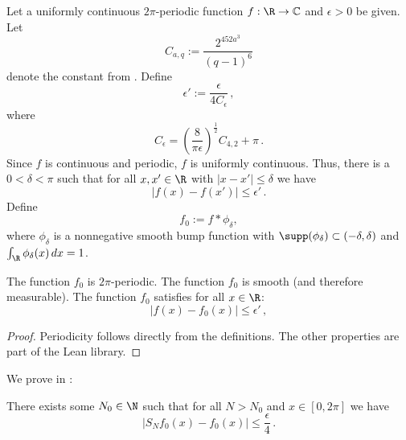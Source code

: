 Let a uniformly continuous $2\pi$-periodic function $f:\R\to \mathbb{C}$ and $\epsilon>0$ be given.
Let
\begin{equation}
    C_{a,q} := \frac{2^{452a^3}}{(q-1)^6}
\end{equation}
denote the constant from .
Define
\begin{equation}
    \epsilon' := \frac {\epsilon} {4 C_\epsilon} \,,
\end{equation}
where
\begin{equation*}
    C_\epsilon = \left(\frac{8}{\pi\epsilon}\right)^\frac{1}{2} C_{4,2} + \pi \,.
\end{equation*}
Since $f$ is continuous and periodic, $f$ is uniformly continuous.
Thus, there is a $0<\delta<\pi$
such that for all $x,x' \in \R$ with $|x-x'|\le \delta$
we have
\begin{equation}\label{uniconbound}
|f(x)-f(x')|\le \epsilon' \, .
\end{equation}
Define
\begin{equation}\label{def-fzero}
f_0:=f \ast \phi_\delta,
\end{equation}
where $\phi_\delta$ is a nonnegative smooth bump function with $\supp (\phi_\delta) \subset (-\delta, \delta)$ and $\int _\R \phi_\delta (x) \, dx = 1$.

\begin{lemma}
\label{smooth-approximation}
\leanok
{}
    The function $f_0$ is $2\pi$-periodic.
    The function $f_0$ is smooth (and therefore measurable).
    The function $f_0$ satisfies for all $x\in \R$:
    \begin{equation}\label{eq-ffzero}
    |f(x)-f_0(x)|\le \epsilon' \, ,
    \end{equation}
\end{lemma}

\begin{proof}
    \leanok
    Periodicity follows directly from the definitions. The other properties are part of the Lean library.
\end{proof}

We prove in :
\begin{lemma}
\label{convergence-for-smooth}
\leanok
{}
    There exists some $N_0 \in \N$ such that for all $N>N_0$ and $x\in [0,2\pi]$ we have
    \begin{equation}
        |S_N f_0 (x)- f_0(x)|\le \frac \epsilon 4\, .
    \end{equation}
\end{lemma}


